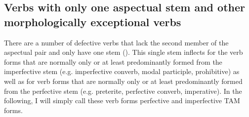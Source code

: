 \subsection{Verbs with only one aspectual stem and other morphologically exceptional verbs}
\label{ssec:Verbs with only one aspectual stem} 
There are a number of defective verbs that lack the second member of the aspectual pair and only have one stem (). This single stem inflects for the verb forms that are normally only or at least predominantly formed from the imperfective stem (e.g. imperfective converb, modal participle, prohibitive) as well as for verb forms that are normally only or at least predominantly formed from the perfective stem (e.g. preterite, perfective converb, imperative). In the following, I will simply call these verb forms perfective and imperfective TAM forms.
%
